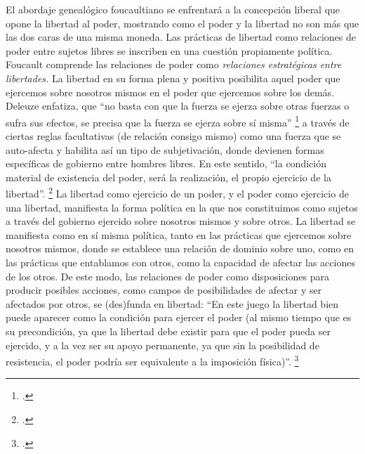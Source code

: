 El abordaje genealógico foucaultiano se enfrentará a la concepción liberal que opone la libertad al poder, mostrando como el poder y la libertad no son más que las dos caras de una misma moneda. Las prácticas de libertad como relaciones de poder entre sujetos libres se inscriben en una cuestión propiamente política. Foucault comprende las relaciones de poder como \emph{relaciones estratégicas entre libertades.} La libertad en su forma plena y positiva posibilita aquel poder que ejercemos sobre nosotros mismos en el poder que ejercemos sobre los demás. Deleuze enfatiza, que \enquote{no basta con que la fuerza se ejerza sobre otras fuerzas o sufra sus efectos, se precisa que la fuerza se ejerza sobre sí misma} \footcite[][181]{@7047-FOUCAULT2008} a través de ciertas reglas facultativas (de relación consigo mismo) como una fuerza que se auto-afecta y habilita así un tipo de subjetivación, donde devienen formas específicas de gobierno entre hombres libres. En este sentido, \enquote{la condición material de existencia del poder, será la realización, el propio ejercicio de la libertad}. \footcite[][111-112]{@7055-ARANCIBIA2005} La libertad como ejercicio de un poder, y el poder como ejercicio de una libertad, manifiesta la forma política en la que nos constituimos como sujetos a través del gobierno ejercido sobre nosotros mismos y sobre otros. La libertad se manifiesta como en sí misma política, tanto en las prácticas que ejercemos sobre nosotros mismos, donde se establece una relación de dominio sobre uno, como en las prácticas que entablamos con otros, como la capacidad de afectar las acciones de los otros. De este modo, las relaciones de poder como disposiciones para producir posibles acciones, como campos de posibilidades de afectar y ser afectados por otros, se (des)funda en libertad: \enquote{En este juego la libertad bien puede aparecer como la condición para ejercer el poder (al mismo tiempo que es su precondición, ya que la libertad debe existir para que el poder pueda ser ejercido, y a la vez ser su apoyo permanente, ya que sin la posibilidad de resistencia, el poder podría ser equivalente a la imposición física)}. \footcite[][254]{@7056-FOUCAULT2001}

